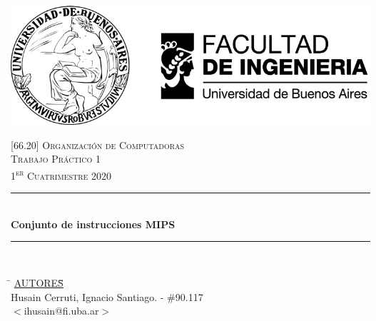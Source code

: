

\pagestyle{fancy}
\begin{titlepage}
	\newcommand{\HRule}{\rule{\linewidth}{0.5mm}} %
	\center %
	
	\thispagestyle{empty}
	\begin{center}
		\includegraphics[scale=1]{includes/banner_fiuba.pdf}\\
	\end{center}
	
	
	\textsc{\LARGE \textsc{[66.20] Organización de Computadoras}}\\[0.5cm]
	\textsc{\Large \textsc{Trabajo Práctico 1}}\\[0.5cm]
	\textsc{\large 1\textsuperscript{er} Cuatrimestre 2020}\\[0.25cm]
	
	\HRule\\[0.5cm]
	{\huge\bfseries Conjunto de instrucciones MIPS}\\[0.2cm]
	\HRule\\[0.5cm]
	
	\begin{tabbing}
		\hspace{2cm}\=\+
		\underline{AUTORES}\hspace{-1cm}\=\+\hspace{1cm}\=\hspace{6cm}\=\\[0.2cm]
		
		Husain Cerruti, Ignacio Santiago.	\>\>- \#90.117\\
		\>\footnotesize{$<$ihusain@fi.uba.ar$>$}\\
		

\end{tabbing}
\end{titlepage}
